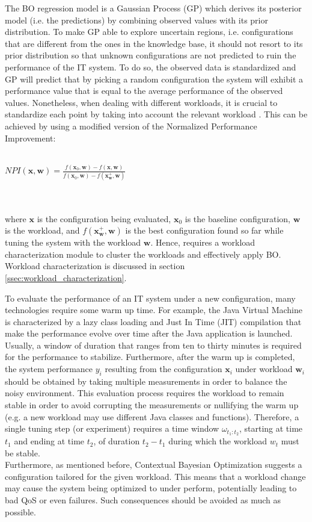 \documentclass[a4paper]{article} %
\begin{document}
	The BO regression model is a Gaussian Process (GP) which derives its posterior model (i.e. the predictions) by combining observed values with its prior distribution. To make GP able to explore uncertain regions, i.e. configurations that are different from the ones in the knowledge base, it should not resort to its prior distribution \cite{AkamasCGP} so that unknown configurations are not predicted to ruin the performance of the IT system. To do so, the observed data is standardized and GP will predict that by picking a random configuration the system will exhibit a performance value that is equal to the average performance of the observed values. Nonetheless, when dealing with different workloads, it is crucial to standardize each point by taking into account the relevant workload \cite{AkamasCGP}. This can be achieved by using a modified version of the Normalized Performance Improvement:\\\\
	\centerline{
	$
	NPI(\pmb{x}, \pmb{w}) = \frac{f(\pmb{x}_0, \pmb{w}) - f(\pmb{x}, \pmb{w})}{f(\pmb{x}_0, \pmb{w}) - f(\pmb{x}^+_{\pmb{w}}, \pmb{w})}
	$
	}\\\\
	where $\pmb{x}$ is the configuration being evaluated, $\pmb{x}_0$ is the baseline configuration, $\pmb{w}$ is the workload, and $f(\pmb{x}^+_{\pmb{w}}, \pmb{w})$ is the best configuration found so far while tuning the system with the workload $\pmb{w}$. Hence, \cite{AkamasCGP} requires a workload characterization module to cluster the workloads and effectively apply BO. Workload characterization is discussed in section \ref{ssec:workload_characterization}.
	
	To evaluate the performance of an IT system under a new configuration, many technologies require some warm up time. For example, the Java Virtual Machine is characterized by a lazy class loading and Just In Time (JIT) compilation that make the performance evolve over time after the Java application is launched. Usually, a window of duration that ranges from ten to thirty minutes is required for the performance to stabilize. Furthermore, after the warm up is completed, the system performance $y_i$ resulting from the configuration $\pmb{x}_i$ under workload $\pmb{w}_i$ should be obtained by taking multiple measurements in order to balance the noisy environment. This evaluation process requires the workload to remain stable in order to avoid corrupting the measurements or nullifying the warm up (e.g. a new workload may use different Java classes and functions). Therefore, a single tuning step (or experiment) requires a time window $\omega_{t_1:t_2}$, starting at time $t_1$ and ending at time $t_2$, of duration $t_2 - t_1$ during which the workload $w_t$ must be stable.\\
	Furthermore, as mentioned before, Contextual Bayesian Optimization suggests a configuration tailored for the given workload.  This means that a workload change may cause the system being optimized to under perform, potentially leading to bad QoS or even failures. Such consequences should be avoided as much as possible.
	
\end{document}
